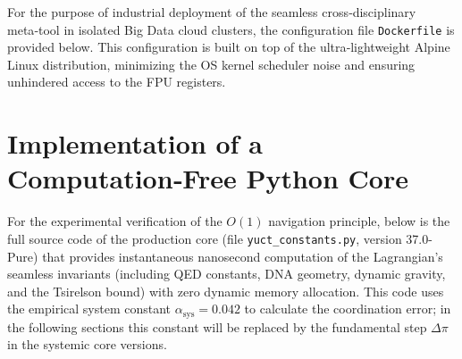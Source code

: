 \documentclass[12pt,a4paper]{article}
\begin{document}
	
	For the purpose of industrial deployment of the seamless cross‑disciplinary meta‑tool in isolated Big Data cloud clusters, the configuration file \texttt{Dockerfile} is provided below. This configuration is built on top of the ultra‑lightweight Alpine Linux distribution, minimizing the OS kernel scheduler noise and ensuring unhindered access to the FPU registers.
	
	
	
	\section{Implementation of a Computation‑Free Python Core}
	For the experimental verification of the \(O(1)\) navigation principle, below is the full source code of the production core (file \texttt{yuct\_constants.py}, version 37.0-Pure) that provides instantaneous nanosecond computation of the Lagrangian's seamless invariants (including QED constants, DNA geometry, dynamic gravity, and the Tsirelson bound) with zero dynamic memory allocation. This code uses the empirical system constant \(\alpha_{\text{sys}} = 0.042\) to calculate the coordination error; in the following sections this constant will be replaced by the fundamental step \(\Delta\pi\) in the systemic core versions.
	
\end{document}
